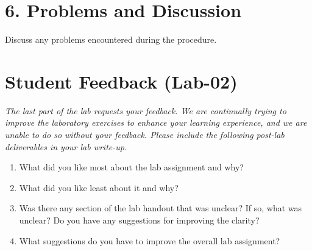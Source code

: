 \section*{6. Problems and Discussion}
Discuss any problems encountered during the procedure.








\vspace{5cm}

\section*{Student Feedback (Lab-02)}
\textit{The last part of the lab requests your feedback. We are continually trying to improve the laboratory exercises to enhance your learning experience, and we are unable to do so without your feedback. Please include the following post-lab deliverables in your lab write-up.}

\begin{enumerate}[leftmargin=*]
    \item What did you like most about the lab assignment and why?
    \item What did you like least about it and why?
    \item Was there any section of the lab handout that was unclear? If so, what was unclear? Do you have any suggestions for improving the clarity?
    \item What suggestions do you have to improve the overall lab assignment?
\end{enumerate}